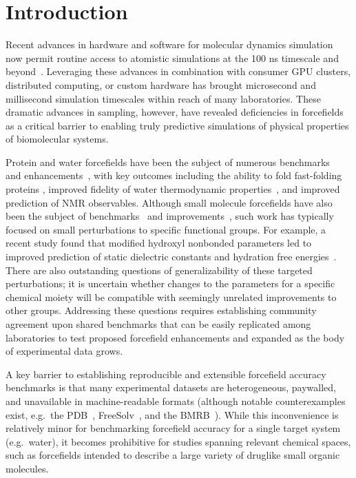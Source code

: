 \documentclass[aip, jcp, reprint]{revtex4-1}  %
\begin{document}
\section{Introduction}

Recent advances in hardware and software for molecular dynamics simulation now permit routine access to atomistic simulations at the 100 ns timescale and beyond~\cite{salomon2013routine}.
Leveraging these advances in combination with consumer GPU clusters, distributed computing, or custom hardware has brought microsecond and millisecond simulation timescales within reach of many laboratories.  
These dramatic advances in sampling, however, have revealed deficiencies in forcefields as a critical barrier to enabling truly predictive simulations of physical properties of biomolecular systems.  

Protein and water forcefields have been the subject of numerous benchmarks~\cite{lindorff2012systematic, beauchamp2012protein, best2008} and enhancements~\cite{li2011iterative, best2012optimization, Lindorff-Larsen2010}, with key outcomes including the ability to fold fast-folding proteins \cite{shaw2011, ensign2007heterogeneity, Voelz2010}, improved fidelity of water thermodynamic properties~\cite{horn2004}, and improved prediction of NMR observables.  
Although small molecule forcefields have also been the subject of benchmarks~\cite{caleman2011force, fischer2015properties, zhang2015force} and improvements~\cite{fennell2014fixed}, such work has typically focused on small perturbations to specific functional groups.  
For example, a recent study found that modified hydroxyl nonbonded parameters led to improved prediction of static dielectric constants and hydration free energies~\cite{fennell2014fixed}.
There are also outstanding questions of generalizability of these targeted perturbations; it is uncertain whether changes to the parameters for a specific chemical moiety will be compatible with seemingly unrelated improvements to other groups.
Addressing these questions requires establishing community agreement upon shared benchmarks that can be easily replicated among laboratories to test proposed forcefield enhancements and expanded as the body of experimental data grows.

A key barrier to establishing reproducible and extensible forcefield accuracy benchmarks is that many experimental datasets are heterogeneous, paywalled, and unavailable in machine-readable formats (although notable counterexamples exist, e.g.~the PDB~\cite{Berman2000}, FreeSolv~\cite{freesolv}, and the BMRB~\cite{Ulrich2008}).  
While this inconvenience is relatively minor for benchmarking forcefield accuracy for a single target system (e.g.~water), it becomes prohibitive for studies spanning relevant chemical spaces, such as forcefields intended to describe a large variety of druglike small organic molecules.  
\end{document}
